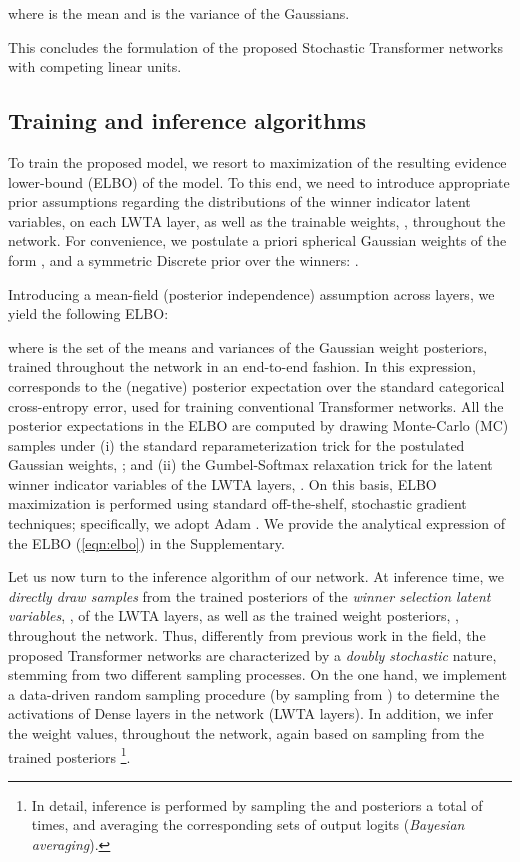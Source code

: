 \documentclass[10pt,twocolumn,letterpaper]{article}
\begin{document}
where  is the mean and  is the variance of the Gaussians.

This concludes the formulation of the proposed Stochastic Transformer networks with competing linear units.


\subsection{Training and inference algorithms}

To train the proposed model, we resort to maximization of the resulting evidence lower-bound (ELBO) of the model. To this end, we need to introduce appropriate prior assumptions regarding the distributions of the winner indicator latent variables,  on each LWTA layer, as well as the trainable weights, , throughout the network. For convenience, we postulate a priori spherical Gaussian weights of the form , and a symmetric Discrete prior over the winners: .

Introducing a mean-field (posterior independence) assumption across layers, we yield the following ELBO:

where  is the set of the means and variances of the Gaussian weight posteriors, trained throughout the network in an end-to-end fashion. In this expression,  corresponds to the (negative) posterior expectation over the standard categorical cross-entropy error, used for training conventional Transformer networks. All the posterior expectations in the ELBO are computed by drawing Monte-Carlo (MC) samples under (i) the standard reparameterization trick for the postulated Gaussian weights, ; and (ii) the Gumbel-Softmax relaxation trick \cite{Maddison2017,jang2017categorical} for the latent winner indicator variables of the LWTA layers, . 
On this basis, ELBO maximization is performed using standard off-the-shelf, stochastic gradient techniques; specifically, we adopt Adam \cite{kingma2014adam}. We provide the analytical expression of the ELBO (\ref{eqn:elbo}) in the Supplementary.

Let us now turn to the inference algorithm of our network. At inference time, we \emph{directly draw samples} from the trained posteriors of the \emph{winner selection latent variables}, , of the LWTA layers, as well as the trained weight posteriors, , throughout the network. Thus, differently from previous work in the field, the proposed Transformer networks are characterized by a \emph{doubly stochastic} nature, stemming from two different sampling processes. On the one hand, we implement a data-driven random sampling procedure (by sampling from ) to determine the activations of Dense layers in the network (LWTA layers). In addition, we infer the weight values, throughout the network, again based on sampling from the trained posteriors \footnote{In detail, inference is performed by sampling the  and  posteriors a total of  times, and averaging the corresponding  sets of output logits (\emph{Bayesian averaging}).}.    
\end{document}
